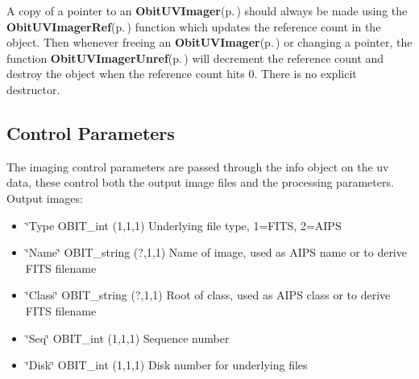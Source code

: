 A copy of a pointer to an {\bf Obit\-UVImager}{\rm (p.\,\pageref{structObitUVImager})} should always be made using the {\bf Obit\-UVImager\-Ref}{\rm (p.\,\pageref{ObitUVImager_8h_a1})} function which updates the reference count in the object. Then whenever freeing an {\bf Obit\-UVImager}{\rm (p.\,\pageref{structObitUVImager})} or changing a pointer, the function {\bf Obit\-UVImager\-Unref}{\rm (p.\,\pageref{ObitUVImager_8h_a0})} will decrement the reference count and destroy the object when the reference count hits 0. There is no explicit destructor.\subsection{Control Parameters}\label{ObitUVImager_8h_ObitUVImagerparameters}
The imaging control parameters are passed through the info object on the uv data, these control both the output image files and the processing parameters. Output images: \begin{itemize}
\item \char`\"{}Type OBIT\_\-int (1,1,1) Underlying file type, 1=FITS, 2=AIPS \item \char`\"{}Name\char`\"{} OBIT\_\-string (?,1,1) Name of image, used as AIPS name or to derive FITS filename \item \char`\"{}Class\char`\"{} OBIT\_\-string (?,1,1) Root of class, used as AIPS class or to derive FITS filename \item \char`\"{}Seq\char`\"{} OBIT\_\-int (1,1,1) Sequence number \item \char`\"{}Disk\char`\"{} OBIT\_\-int (1,1,1) Disk number for underlying files\end{itemize}
